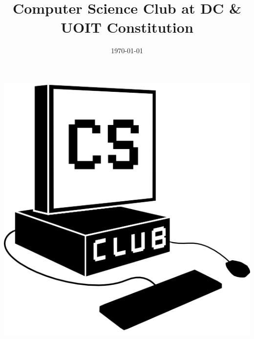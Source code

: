 \documentclass{article}
\begin{document}
\title{Computer Science Club at DC \& UOIT Constitution}
\date{\today}
\maketitle

\centering
\includegraphics{logo}
\end{document}
